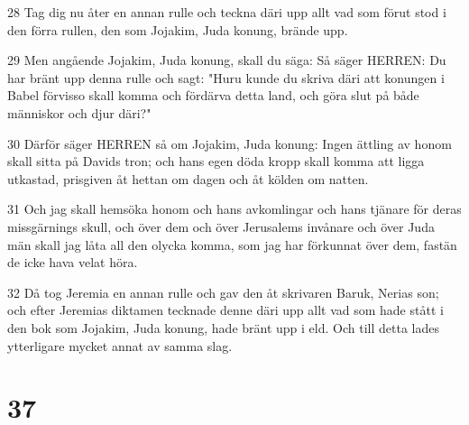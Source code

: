 \par 28 Tag dig nu åter en annan rulle och teckna däri upp allt vad som förut stod i den förra rullen, den som Jojakim, Juda konung, brände upp.
\par 29 Men angående Jojakim, Juda konung, skall du säga: Så säger HERREN: Du har bränt upp denna rulle och sagt: "Huru kunde du skriva däri att konungen i Babel förvisso skall komma och fördärva detta land, och göra slut på både människor och djur däri?"
\par 30 Därför säger HERREN så om Jojakim, Juda konung: Ingen ättling av honom skall sitta på Davids tron; och hans egen döda kropp skall komma att ligga utkastad, prisgiven åt hettan om dagen och åt kölden om natten.
\par 31 Och jag skall hemsöka honom och hans avkomlingar och hans tjänare för deras missgärnings skull, och över dem och över Jerusalems invånare och över Juda män skall jag låta all den olycka komma, som jag har förkunnat över dem, fastän de icke hava velat höra.
\par 32 Då tog Jeremia en annan rulle och gav den åt skrivaren Baruk, Nerias son; och efter Jeremias diktamen tecknade denne däri upp allt vad som hade stått i den bok som Jojakim, Juda konung, hade bränt upp i eld. Och till detta lades ytterligare mycket annat av samma slag.

\chapter{37}

